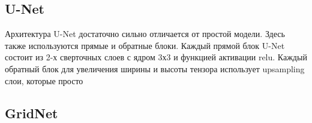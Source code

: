 \subsection{U-Net}

Архитектура U-Net \cite{unet} достаточно сильно отличается от простой модели. Здесь также используются прямые и обратные блоки. Каждый прямой блок U-Net состоит из 2-х сверточных слоев с ядром 3х3 и функцией активации relu. Каждый обратный блок для увеличения ширины и высоты тензора использует upsampling слои, которые просто

\subsection{GridNet}
